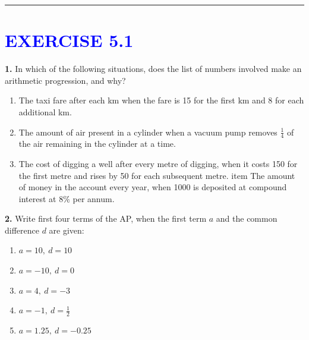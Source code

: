 \documentclass[12pt]{article}
\begin{document}
\pagestyle{empty} %

\thispagestyle{fancy} %
\fancyhf{} %
\renewcommand{\headrulewidth}{0pt} %

\noindent\rule{\textwidth}{0.5pt}



\section*{\textcolor{blue}{\large EXERCISE 5.1}}

\textbf{1.} In which of the following situations, does the list of numbers involved make an arithmetic progression, and why?

\begin{enumerate}[label=(\alph*)]
    \item The taxi fare after each km when the fare is 15 for the first km and 8 for each additional km.
    \item The amount of air present in a cylinder when a vacuum pump removes $\frac{1}{4}$ of the air remaining in the cylinder at a time.
    \item The cost of digging a well after every metre of digging, when it costs 150 for the first metre and rises by 50 for each subsequent metre.
    item The amount of money in the account every year, when 1000 is deposited at compound interest at $8\%$ per annum.
\end{enumerate}

\textbf{2.} Write first four terms of the AP, when the first term \( a \) and the common difference \( d \) are given:

\begin{multicols}{2}
\begin{enumerate}[label=(\alph*)]
    \item \( a = 10,\ d = 10 \)
    \item \( a = -10,\ d = 0 \)
    \item \( a = 4,\ d = -3 \)
    \item \( a = -1,\ d = \frac{1}{2} \)
    \item \( a = 1.25,\ d = -0.25 \)
\end{enumerate}
\end{multicols}
\end{document}
